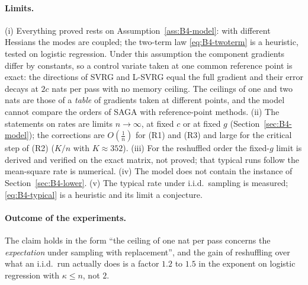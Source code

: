 \paragraph{Limits.} (i) Everything proved rests on Assumption~\ref{ass:B4-model}: with different Hessians the modes are coupled; the two-term law \eqref{eq:B4-twoterm} is a heuristic, tested on logistic regression. Under this assumption the component gradients differ by constants, so a control variate taken at one common reference point is exact: the directions of SVRG and L-SVRG equal the full gradient and their error decays at $2c$ nats per pass with no memory ceiling. The ceilings of one and two nats are those of a \emph{table} of gradients taken at different points, and the model cannot compare the orders of SAGA with reference-point methods. (ii) The statements on rates are limits $n\to\infty$, at fixed $c$ or at fixed $g$ (Section~\ref{sec:B4-model}); the corrections are $O(\frac1n)$ for (R1) and (R3) and large for the critical step of (R2) ($K/n$ with $K\approx352$). (iii) For the reshuffled order the fixed-$g$ limit is derived and verified on the exact matrix, not proved; that typical runs follow the mean-square rate is numerical. (iv) The model does not contain the instance of Section~\ref{sec:B4-lower}. (v) The typical rate under i.i.d.\ sampling is measured; \eqref{eq:B4-typical} is a heuristic and its limit a conjecture.

\paragraph{Outcome of the experiments.}
The claim holds in the form ``the ceiling of one nat per pass concerns the \emph{expectation} under sampling with replacement'', and the gain of reshuffling over what an i.i.d.\ run actually does is a factor $1.2$ to $1.5$ in the exponent on logistic regression with $\kappa\le n$, not $2$.

